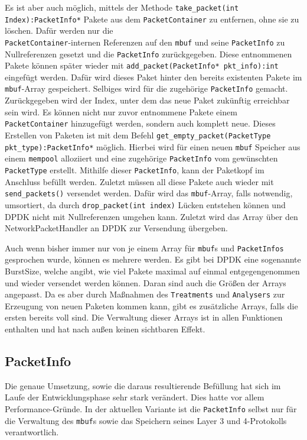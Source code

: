 \documentclass[../review_2.tex]{subfiles}
\begin{document}
Es ist aber auch möglich, mittels der Methode \texttt{take\_packet(int Index):PacketInfo*} Pakete aus dem \texttt{PacketContainer} zu entfernen, ohne sie zu löschen. Dafür werden nur die\\ \texttt{PacketContainer}-internen Referenzen auf den \texttt{mbuf} und seine \texttt{PacketInfo} zu Nullreferenzen gesetzt und die \texttt{PacketInfo} zurückgegeben. Diese entnommenen Pakete können später wieder mit \texttt{add\_packet(PacketInfo* pkt\_info):int} eingefügt werden. Dafür wird dieses Paket hinter den bereits existenten Pakete im \texttt{mbuf}-Array gespeichert. Selbiges wird für die zugehörige \texttt{PacketInfo} gemacht. Zurückgegeben wird der Index, unter dem das neue Paket zukünftig erreichbar sein wird. Es können nicht nur zuvor entnommene Pakete einem \texttt{PacketContainer} hinzugefügt werden, sondern auch komplett neue. Dieses Erstellen von Paketen ist mit dem Befehl \texttt{get\_empty\_packet(PacketType pkt\_type):PacketInfo*} möglich. Hierbei wird für einen neuen \texttt{mbuf} Speicher aus einem \texttt{mempool} alloziiert und eine zugehörige \texttt{PacketInfo} vom gewünschten \texttt{PacketType} erstellt. Mithilfe dieser \texttt{PacketInfo}, kann der Paketkopf im Anschluss befüllt werden. Zuletzt müssen all diese Pakete auch wieder mit \texttt{send\_packets()} versendet werden. Dafür wird das \texttt{mbuf}-Array, falls notwendig, umsortiert, da durch \texttt{drop\_packet(int index)} Lücken entstehen können und DPDK nicht mit Nullreferenzen umgehen kann. Zuletzt wird das Array über den NetworkPacketHandler an DPDK zur Versendung übergeben.

Auch wenn bisher immer nur von je einem Array für \texttt{mbuf}s und \texttt{PacketInfos} gesprochen wurde, können es mehrere werden. Es gibt bei DPDK eine sogenannte BurstSize, welche angibt, wie viel Pakete maximal auf einmal entgegengenommen und wieder versendet werden können. Daran sind auch die Größen der Arrays angepasst. Da es aber durch Maßnahmen des \texttt{Treatments} und \texttt{Analysers} zur Erzeugung von neuen Paketen kommen kann, gibt es zusätzliche Arrays, falls die ersten bereits voll sind. Die Verwaltung dieser Arrays ist in allen Funktionen enthalten und hat nach außen keinen sichtbaren Effekt.

\subsection{PacketInfo}
Die genaue Umsetzung, sowie die daraus resultierende Befüllung hat sich im Laufe der Entwicklungsphase sehr stark verändert. Dies hatte vor allem Performance-Gründe. In der aktuellen Variante ist die \texttt{PacketInfo} selbst nur für die Verwaltung des \texttt{mbuf}s sowie das Speichern seines Layer 3 und 4-Protokolls verantwortlich. 
\end{document}
